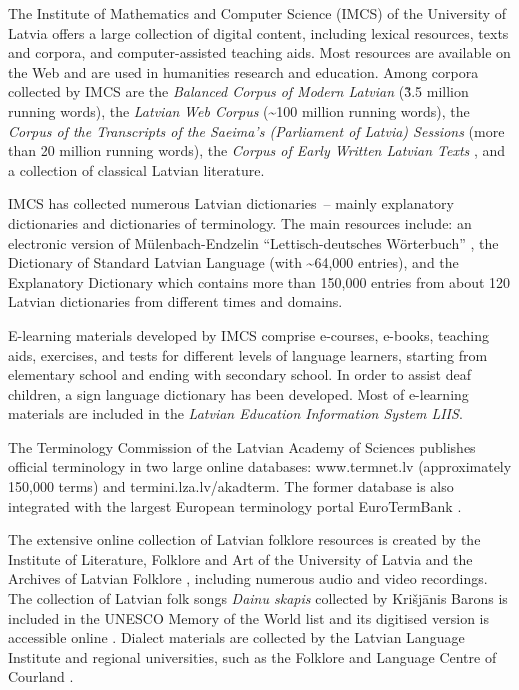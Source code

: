 \begin{multicols}{2}
The Institute of Mathematics and Computer Science (IMCS) of the University of Latvia offers a large collection of digital content, including lexical resources, texts and corpora, and computer-assisted teaching aids.
Most resources are available on the Web \cite{Meta7} and are used in humanities research and education.
Among corpora collected by IMCS are the \textit{Balanced Corpus of Modern Latvian} \cite{Meta8} (\~3.5 million running words), the \textit{Latvian} \textit{Web Corpus} (\~{}100 million running words), the \textit{Corpus of the Transcripts of the Saeima's (Parliament of Latvia) Sessions} (more than 20 million running words), the \textit{Corpus of Early Written Latvian Texts} \cite{Meta9, metaAndronova}, and a collection of classical Latvian literature.

IMCS has collected numerous Latvian dictionaries~-- mainly explanatory dictionaries and dictionaries of terminology.
The main resources include: an electronic version of Mülenbach-Endzelin ``Lettisch-deutsches Wörterbuch'' \cite{Meta10}, the Dictionary of Standard Latvian Language (with \~{}64,000 entries), and the Explanatory Dictionary which contains more than 150,000 entries from about 120 Latvian dictionaries from different times and domains.

E-learning materials developed by IMCS comprise e-courses, e-books, teaching aids, exercises, and tests for different levels of language learners, starting from elementary school and ending with secondary school.
In order to assist deaf children, a sign language dictionary has been developed.
Most of e-learning materials are included in the \textit{Latvian Education Information System LIIS}.

The Terminology Commission of the Latvian Academy of Sciences publishes official terminology in two large online databases: www.termnet.lv (approximately 150,000 terms) and termini.lza.lv/akadterm.
The former database is also integrated with the largest European terminology portal EuroTermBank \cite{Meta61}.

The extensive online collection of Latvian folklore resources is created by the Institute of Literature, Folklore and Art of the University of Latvia and the Archives of Latvian Folklore \cite{Meta11}, including numerous audio and video recordings.
The collection of Latvian folk songs \textit{Dainu skapis} collected by Krišjānis Barons is included in the UNESCO Memory of the World list and its digitised version is accessible online \cite{Meta12}.
Dialect materials are collected by the Latvian Language Institute and regional universities, such as the Folklore and Language Centre of Courland \cite{Meta13}.


\end{multicols}
